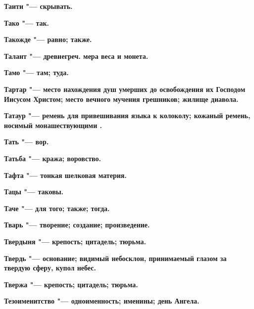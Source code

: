 \bfseries Таити \normalfont{} "--- скрывать. 




\bfseries Тако \normalfont{} "--- так. 




\bfseries Такожде \normalfont{} "--- равно; также. 




\bfseries Талант \normalfont{} "--- древнегреч. мера веса и монета. 




\bfseries Тамо \normalfont{} "--- там; туда. 




\bfseries Тартар \normalfont{} "--- место нахождения душ умерших до освобождения их Господом Иисусом Христом; место вечного мучения грешников; жилище диавола. 




\bfseries Татаур \normalfont{} "--- ремень для привешивания языка к колоколу; кожаный ремень, носимый монашествующими . 




\bfseries Тать \normalfont{} "--- вор. 




\bfseries Татьба \normalfont{} "--- кража; воровство. 




\bfseries Тафта \normalfont{} "--- тонкая шелковая материя. 




\bfseries Тацы \normalfont{} "--- таковы. 




\bfseries Таче \normalfont{} "--- для того; также; тогда. 




\bfseries Тварь \normalfont{} "--- творение; создание; произведение. 




\bfseries Твердыня \normalfont{} "--- крепость; цитадель; тюрьма. 




\bfseries Твердь \normalfont{} "--- основание; видимый небосклон, принимаемый глазом за твердую сферу, купол небес. 




\bfseries Твержа \normalfont{} "--- крепость; цитадель; тюрьма. 




\bfseries Тезоименитство \normalfont{} "--- одноименность; именины; день Ангела. 




